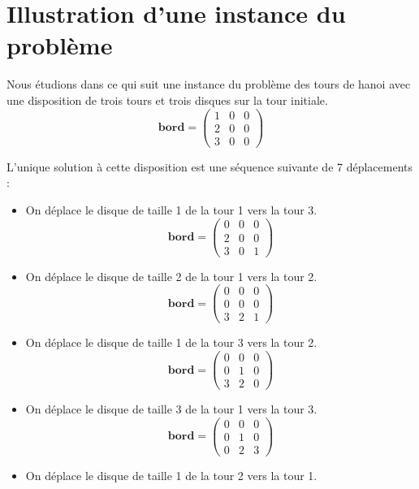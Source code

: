 \section{Illustration d'une instance du problème}
Nous étudions dans ce qui suit une instance du problème des tours de hanoi avec une disposition de trois tours et trois disques sur la tour initiale.
$$
\mathbf{bord} = 
\begin{pmatrix}
    1 & 0 & 0 \\
    2 & 0 & 0 \\
    3 & 0 & 0 
\end{pmatrix}
$$
\par
L'unique solution à cette disposition est une séquence suivante de 7 déplacements :
\begin{itemize}
    \item On déplace le disque de taille 1 de la tour 1 vers la tour 3.
        $$
        \mathbf{bord} = 
        \begin{pmatrix}
            0 & 0 & 0 \\
            2 & 0 & 0 \\
            3 & 0 & 1 
        \end{pmatrix}
        $$
    \item On déplace le disque de taille 2 de la tour 1 vers la tour 2.
        $$
        \mathbf{bord} = 
        \begin{pmatrix}
            0 & 0 & 0 \\
            0 & 0 & 0 \\
            3 & 2 & 1 
        \end{pmatrix}
        $$
    \item On déplace le disque de taille 1 de la tour 3 vers la tour 2.
        $$
        \mathbf{bord} = 
        \begin{pmatrix}
            0 & 0 & 0 \\
            0 & 1 & 0 \\
            3 & 2 & 0 
        \end{pmatrix}
        $$
    \item On déplace le disque de taille 3 de la tour 1 vers la tour 3.
        $$
        \mathbf{bord} = 
        \begin{pmatrix}
            0 & 0 & 0 \\
            0 & 1 & 0 \\
            0 & 2 & 3 
        \end{pmatrix}
        $$
    \item On déplace le disque de taille 1 de la tour 2 vers la tour 1.

\end{itemize}
